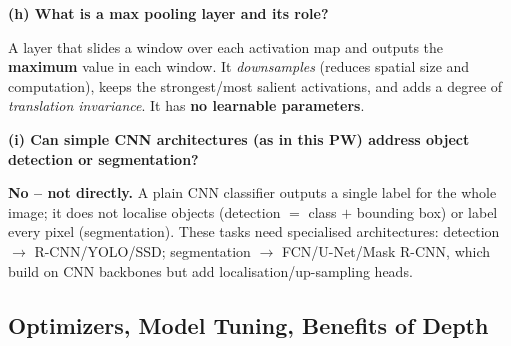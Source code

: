 \documentclass[10pt,a4paper]{article}
\begin{document}
\begin{enumerate}[leftmargin=*,label=\textbf{Q\arabic*.}]
\textbf{(h) What is a max pooling layer and its role?}
\begin{answerbox}
A layer that slides a window over each activation map and outputs the \textbf{maximum} value in each window. It \emph{downsamples} (reduces spatial size and computation), keeps the strongest/most salient activations, and adds a degree of \emph{translation invariance}. It has \textbf{no learnable parameters}.
\end{answerbox}

\textbf{(i) Can simple CNN architectures (as in this PW) address object detection or segmentation?}
\begin{answerbox}
\textbf{No -- not directly.} A plain CNN classifier outputs a single label for the whole image; it does not localise objects (detection $=$ class $+$ bounding box) or label every pixel (segmentation). These tasks need specialised architectures: detection $\to$ R-CNN/YOLO/SSD; segmentation $\to$ FCN/U-Net/Mask R-CNN, which build on CNN backbones but add localisation/up-sampling heads.
\end{answerbox}

\end{enumerate}

\subsection{Optimizers, Model Tuning, Benefits of Depth}
\end{document}
